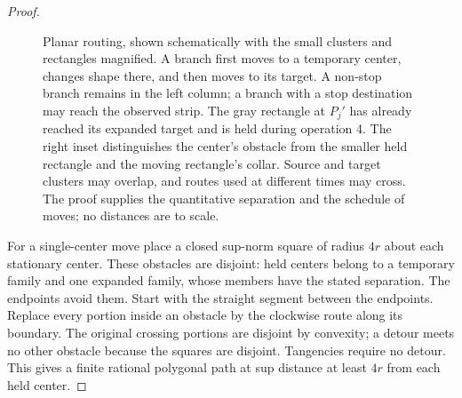 \begin{proof}
\begin{figure}[ht]
\caption{Planar routing, shown schematically with the small clusters and
rectangles magnified. A branch first moves to a temporary center, changes
shape there, and then moves to its target. A non-stop branch remains in the
left column; a branch with a stop destination may reach the observed strip.
The gray rectangle at $P_j'$ has already reached its expanded target and
is held during operation 4. The right inset distinguishes the center's
obstacle from the smaller held rectangle and the moving rectangle's collar.
Source and target clusters
may overlap, and routes used at different times may cross. The proof supplies
the quantitative separation and the schedule of moves; no distances are to scale.}
\label{fig:planar-routing}
\end{figure}


For a single-center move place a closed sup-norm square of radius $4r$ about each stationary center. These obstacles are disjoint: held centers belong to a temporary family and one expanded family, whose members have the stated separation. The endpoints avoid them. Start with the straight segment between the endpoints. Replace every portion inside an obstacle by the clockwise route along its boundary. The original crossing portions are disjoint by convexity; a detour meets no other obstacle because the squares are disjoint. Tangencies require no detour. This gives a finite rational polygonal path at sup distance at least $4r$ from each held center.


\end{proof}
